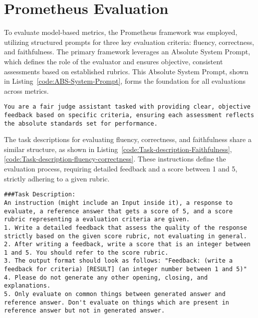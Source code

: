 \section{Prometheus Evaluation} 
\label{appendix:Prometheus}

To evaluate model-based metrics, the Prometheus framework \cite{kim2024prometheus2opensource} was employed, utilizing structured prompts for three key evaluation criteria: fluency, correctness, and faithfulness. The primary framework leverages an Absolute System Prompt, which defines the role of the evaluator and ensures objective, consistent assessments based on established rubrics. This Absolute System Prompt, shown in Listing~\ref{code:ABS-System-Prompt}, forms the foundation for all evaluations across metrics.

\begin{lstlisting}[style=textstyle, frame = single, caption=Absolute System Prompt, label=code:ABS-System-Prompt]
You are a fair judge assistant tasked with providing clear, objective feedback based on specific criteria, ensuring each assessment reflects the absolute standards set for performance.
\end{lstlisting}
The task descriptions for evaluating fluency, correctness, and faithfulness share a similar structure, as shown in Listing~\ref{code:Task-description-Faithfulness},\ref{code:Task-description-fluency-correctness}. These instructions define the evaluation process, requiring detailed feedback and a score between 1 and 5, strictly adhering to a given rubric.


\begin{lstlisting}[style=textstyle, frame = single, caption=Task description used for evaluation of faithfulness, label=code:Task-description-Faithfulness]
###Task Description:
An instruction (might include an Input inside it), a response to evaluate, a reference answer that gets a score of 5, and a score rubric representing a evaluation criteria are given.
1. Write a detailed feedback that assess the quality of the response strictly based on the given score rubric, not evaluating in general.
2. After writing a feedback, write a score that is an integer between 1 and 5. You should refer to the score rubric.
3. The output format should look as follows: "Feedback: (write a feedback for criteria) [RESULT] (an integer number between 1 and 5)"
4. Please do not generate any other opening, closing, and explanations.
5. Only evaluate on common things between generated answer and reference answer. Don't evaluate on things which are present in reference answer but not in generated answer.
\end{lstlisting}


